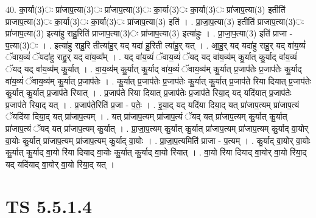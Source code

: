 \documentclass[17pt]{extarticle}
\begin{document}
40. का॒र्या(3)ः प्रा॑जाप॒त्या(3)ः प्रा॑जाप॒त्या(3)ः का॒र्या(3)ः का॒र्या(3)ः प्रा॑जाप॒त्या(3) इतीति॑ प्राजाप॒त्या(3)ः का॒र्या(3)ः का॒र्या(3)ः प्रा॑जाप॒त्या(3) इति॑ । . प्रा॒जा॒प॒त्या(3) इतीति॑ प्राजाप॒त्या(3)ः प्रा॑जाप॒त्या(3) इत्या॑हु राहु॒रिति॑ प्राजाप॒त्या(3)ः प्रा॑जाप॒त्या(3) इत्या॑हुः । . प्रा॒जा॒प॒त्या(3) इति॑ प्राजा - प॒त्या(3)ः । . इत्या॑हु राहु॒रि तीत्या॑हु॒र् यद् यदा॑ हु॒रिती त्या॑हु॒र् यत् । . आ॒हु॒र् यद् यदा॑हु राहु॒र् यद् वा॑य॒व्यं॑ ॅवाय॒व्यं॑ ॅयदा॑हु राहु॒र् यद् वा॑य॒व्य᳚म् । . यद् वा॑य॒व्यं॑ ॅवाय॒व्यं॑ ॅयद् यद् वा॑य॒व्य॑म् कु॒र्यात् कु॒र्याद् वा॑य॒व्यं॑ ॅयद् यद् वा॑य॒व्य॑म् कु॒र्यात् । . वा॒य॒व्य॑म् कु॒र्यात् कु॒र्याद् वा॑य॒व्यं॑ ॅवाय॒व्य॑म् कु॒र्यात् प्र॒जाप॑तेः प्र॒जाप॑तेः कु॒र्याद् वा॑य॒व्यं॑ ॅवाय॒व्य॑म् कु॒र्यात् प्र॒जाप॑तेः । . कु॒र्यात् प्र॒जाप॑तेः प्र॒जाप॑तेः कु॒र्यात् कु॒र्यात् प्र॒जाप॑ते रिया दियात् प्र॒जाप॑तेः कु॒र्यात् कु॒र्यात् प्र॒जाप॑ते रियात् । . प्र॒जाप॑ते रिया दियात् प्र॒जाप॑तेः प्र॒जाप॑ते रिया॒द् यद् यदि॑यात् प्र॒जाप॑तेः प्र॒जाप॑ते रिया॒द् यत् । . प्र॒जाप॑ते॒रिति॑ प्र॒जा - प॒तेः॒ । . इ॒या॒द् यद् यदि॑या दिया॒द् यत् प्रा॑जाप॒त्यम् प्रा॑जाप॒त्यं ॅयदि॑या दिया॒द् यत् प्रा॑जाप॒त्यम् । . यत् प्रा॑जाप॒त्यम् प्रा॑जाप॒त्यं ॅयद् यत् प्रा॑जाप॒त्यम् कु॒र्यात् कु॒र्यात् प्रा॑जाप॒त्यं ॅयद् यत् प्रा॑जाप॒त्यम् कु॒र्यात् । . प्रा॒जा॒प॒त्यम् कु॒र्यात् कु॒र्यात् प्रा॑जाप॒त्यम् प्रा॑जाप॒त्यम् कु॒र्याद् वा॒योर् वा॒योः कु॒र्यात् प्रा॑जाप॒त्यम् प्रा॑जाप॒त्यम् कु॒र्याद् वा॒योः । . प्रा॒जा॒प॒त्यमिति॑ प्राजा - प॒त्यम् । . कु॒र्याद् वा॒योर् वा॒योः कु॒र्यात् कु॒र्याद् वा॒यो रि॑या दियाद् वा॒योः कु॒र्यात् कु॒र्याद् वा॒यो रि॑यात् । . वा॒यो रि॑या दियाद् वा॒योर् वा॒यो रि॑या॒द् यद् यदि॑याद् वा॒योर् वा॒यो रि॑या॒द् यत् । \newline
\pagebreak
{}

\section{ TS 5.5.1.4 }
\end{document}
